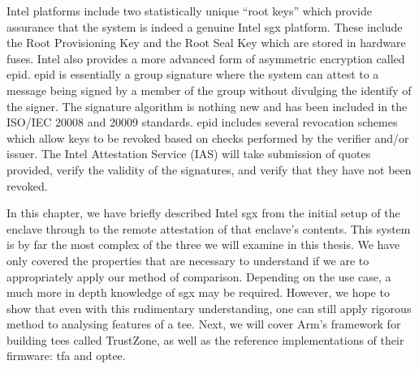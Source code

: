 Intel platforms include two statistically unique ``root keys'' which provide assurance that the system is indeed a genuine Intel \gls{sgx} platform. These include the Root Provisioning Key and the Root Seal Key \cite{johnson2016intel} which are stored in hardware fuses. Intel also provides a more advanced form of asymmetric encryption called \gls{epid}. \gls{epid} is essentially a group signature where the system can attest to a message being signed by a member of the group without divulging the identify of the signer. The signature algorithm is nothing new \cite{brickell2007enhanced} and has been included in the ISO/IEC 20008 and 20009 standards. \gls{epid} includes several revocation schemes which allow keys to be revoked based on checks performed by the verifier and/or issuer. The Intel Attestation Service (IAS) will take submission of quotes provided, verify the validity of the signatures, and verify that they have not been revoked.

In this chapter, we have briefly described Intel \gls{sgx} from the initial setup of the enclave through to the remote attestation of that enclave's contents. This system is by far the most complex of the three we will examine in this thesis. We have only covered the properties that are necessary to understand if we are to appropriately apply our method of comparison. Depending on the use case, a much more in depth knowledge of \gls{sgx} may be required. However, we hope to show that even with this rudimentary understanding, one can still apply rigorous method to analysing features of a \gls{tee}. Next, we will cover Arm's framework for building \glspl{tee} called TrustZone, as well as the reference implementations of their firmware: \gls{tfa} and \gls{optee}.
